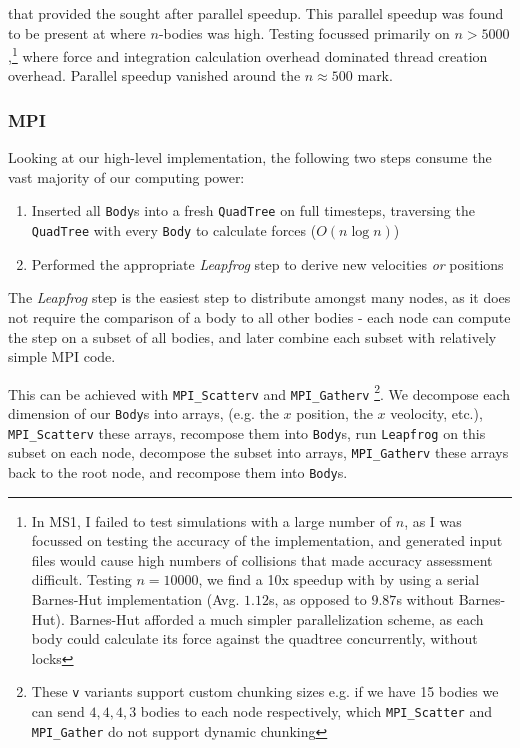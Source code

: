 \documentclass[11pt,a4paper]{article}
\begin{document}
that provided the sought after parallel speedup. This parallel speedup was found to be present at where $n$-bodies was high. Testing focussed primarily on $n > 5000$,\footnote{In MS1, I failed to test simulations with a large number of $n$, as I was focussed on testing the accuracy of the implementation, and generated input files would cause high numbers of collisions that made accuracy assessment difficult. Testing $n=10000$, we find a 10x speedup with by using a serial Barnes-Hut implementation (Avg. $1.12$s, as opposed to $9.87$s without Barnes-Hut). Barnes-Hut afforded a much simpler parallelization scheme, as each body could calculate its force against the quadtree concurrently, without locks} where force and integration calculation overhead dominated thread creation overhead. Parallel speedup vanished around the $n \approx 500$ mark.


\subsubsection*{MPI}

Looking at our high-level implementation, the following two steps consume the vast majority of our computing power:

\begin{enumerate}
    \item Inserted all \texttt{Body}s into a fresh \texttt{QuadTree} on full timesteps, traversing the \texttt{QuadTree} with every \texttt{Body} to calculate forces ($O(n \log n)$)
    \item Performed the appropriate \textit{Leapfrog} step to derive new velocities \textit{or} positions
\end{enumerate}

The \textit{Leapfrog} step is the easiest step to distribute amongst many nodes, as it does not require the comparison of a body to all other bodies - each node can compute the step on a subset of all bodies, and later combine each subset with relatively simple MPI code.

This can be achieved with \texttt{MPI\_Scatterv} and \texttt{MPI\_Gatherv}
\footnote{These \texttt{v} variants support custom chunking sizes e.g. if we have 15 bodies we can send $4, 4, 4, 3$ bodies to each node respectively, which \texttt{MPI\_Scatter} and \texttt{MPI\_Gather} do not support dynamic chunking}. We decompose each dimension of our \texttt{Body}s into arrays, (e.g. the $x$ position, the $x$ veolocity, etc.), \texttt{MPI\_Scatterv} these arrays, recompose them into \texttt{Body}s, run \texttt{Leapfrog} on this subset on each node, decompose the subset into arrays, \texttt{MPI\_Gatherv} these arrays back to the root node, and recompose them into \texttt{Body}s.
\end{document}
